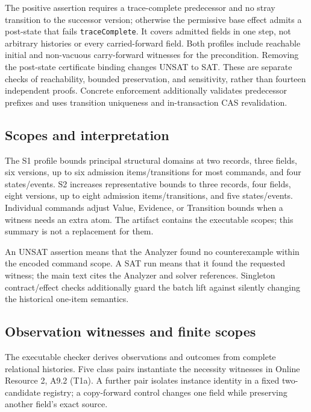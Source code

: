 \documentclass[11pt,a4paper]{article}
\newcommand{\code}[1]{\nolinkurl{#1}}
\begin{document}
The positive assertion requires a trace-complete predecessor and no stray transition to the successor version; otherwise the permissive base effect admits a post-state that fails \code{traceComplete}. It covers admitted fields in one step, not arbitrary histories or every carried-forward field. Both profiles include reachable initial and non-vacuous carry-forward witnesses for the precondition. Removing the post-state certificate binding changes UNSAT to SAT. These are separate checks of reachability, bounded preservation, and sensitivity, rather than fourteen independent proofs. Concrete enforcement additionally validates predecessor prefixes and uses transition uniqueness and in-transaction CAS revalidation.

\subsection{Scopes and interpretation}

The S1 profile bounds principal structural domains at two records, three fields, six versions, up to six admission items/transitions for most commands, and four states/events. S2 increases representative bounds to three records, four fields, eight versions, up to eight admission items/transitions, and five states/events. Individual commands adjust Value, Evidence, or Transition bounds when a witness needs an extra atom. The artifact contains the executable scopes; this summary is not a replacement for them.



An UNSAT assertion means that the Analyzer found no counterexample within the encoded command scope. A SAT run means that it found the requested witness; the main text cites the Analyzer and solver references. Singleton contract/effect checks additionally guard the batch lift against silently changing the historical one-item semantics.


\subsection{Observation witnesses and finite scopes}

The executable checker derives observations and outcomes from complete relational histories. Five class pairs instantiate the necessity witnesses in Online Resource 2, A9.2 (T1a). A further pair isolates instance identity in a fixed two-candidate registry; a copy-forward control changes one field while preserving another field's exact source.
\end{document}
